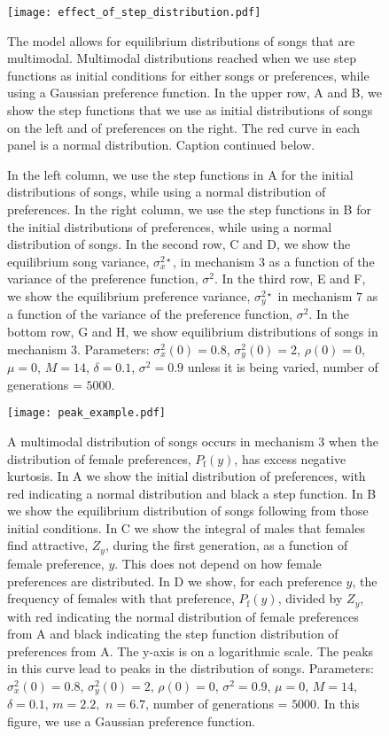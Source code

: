 \documentclass[12pt]{article}
\newcommand{\x}[1]{\text{#1}}
\begin{document}
\begin{figure}
\texttt{[image: effect\_of\_step\_distribution.pdf]}
\caption{\label{effect_of_step_dist}The model allows for equilibrium distributions of songs that are multimodal. Multimodal distributions reached when we use step functions as initial conditions for either songs or preferences, while using a Gaussian preference function. In the upper row, A and B, we show the step functions that we use as initial distributions of songs on the left and of preferences on the right. The red curve in each panel is a normal distribution. Caption continued below.
}
\end{figure}

\addtocounter{figure}{-1}
\begin{figure}
\caption{
In the left column, we use the step functions in A for the initial distributions of songs, while using a normal distribution of preferences. In the right column, we use the step functions in B for the initial distributions of preferences, while using a normal distribution of songs.  In the second row, C and D, we show the equilibrium song variance, $\sigma_x^{2\star}$, in mechanism $3$ as a function of the variance of the preference function, $\sigma^2$. In the third row, E and F, we show the equilibrium preference variance, $\sigma_y^{2\star}$ in mechanism $7$ as a function of the variance of the preference function, $\sigma^2$. In the bottom row, G and H, we show equilibrium distributions of songs in mechanism $3$. Parameters: $\sigma_x^2(0)=0.8$, $\sigma_y^2(0)=2$, $\rho(0)=0$, $\mu=0$, $M=14$, $\delta=0.1$, $\sigma^2=0.9$ unless it is being varied, number of generations = $5000$. }
\end{figure}

\begin{figure}
\texttt{[image: peak\_example.pdf]}
\caption{\label{peak_example}  A multimodal distribution of songs occurs in mechanism 3 when the distribution of female preferences, $P_\x{f}(y)$, has excess negative kurtosis. In A we show the initial distribution of preferences, with red indicating a normal distribution and black a step function. In B we show the equilibrium distribution of songs following from those initial conditions. In C we show the integral of males that females find attractive, $Z_y$, during the first generation, as a function of female preference, $y$. This does not depend on how female preferences are distributed. In D we show, for each preference $y$, the frequency of females with that preference, $P_\x{f}(y)$, divided by $Z_y$, with red indicating the normal distribution of female preferences from A and black indicating the step function distribution of preferences from A. The y-axis is on a logarithmic scale. The peaks in this curve lead to peaks in the distribution of songs. Parameters: $\sigma_x^2(0)=0.8$, $\sigma_y^2(0)=2$, $\rho(0)=0$, $\sigma^2=0.9$, $\mu=0$, $M=14$, $\delta=0.1$, $m=2.2,$ $n=6.7$, number of generations = $5000$. In this figure, we use a Gaussian preference function. 
}
\end{figure}
\end{document}
